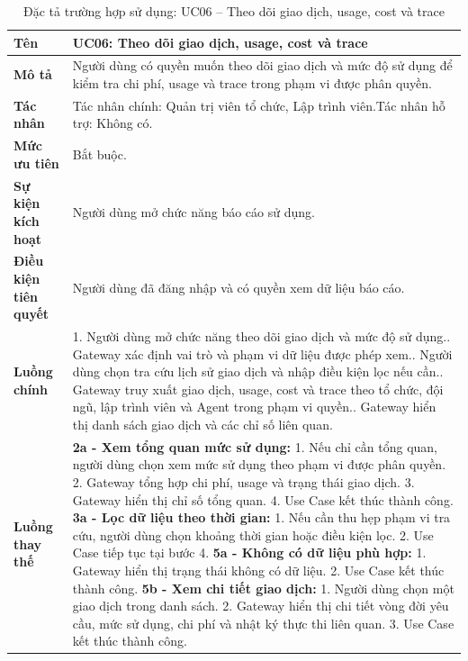 \begin{longtable}{|L{4.2cm}|L{9.5cm}|}
\caption[Đặc tả UC06]{Đặc tả trường hợp sử dụng: UC06 -- Theo dõi giao dịch, usage, cost và trace} \\\hline
\textbf{Tên} & UC06: Theo dõi giao dịch, usage, cost và trace \\\hline
\textbf{Mô tả} & Người dùng có quyền muốn theo dõi giao dịch và mức độ sử dụng để kiểm tra chi phí, usage và trace trong phạm vi được phân quyền.\\\hline
\textbf{Tác nhân} & Tác nhân chính: Quản trị viên tổ chức, Lập trình viên.\newline Tác nhân hỗ trợ: Không có.\\\hline
\textbf{Mức ưu tiên} & Bắt buộc.\\\hline
\textbf{Sự kiện kích hoạt} & Người dùng mở chức năng báo cáo sử dụng.\\\hline
\textbf{Điều kiện tiên quyết} & Người dùng đã đăng nhập và có quyền xem dữ liệu báo cáo.\\\hline
\textbf{Luồng chính} &
1. Người dùng mở chức năng theo dõi giao dịch và mức độ sử dụng.. Gateway xác định vai trò và phạm vi dữ liệu được phép xem.. Người dùng chọn tra cứu lịch sử giao dịch và nhập điều kiện lọc nếu cần.. Gateway truy xuất giao dịch, usage, cost và trace theo tổ chức, đội ngũ, lập trình viên và Agent trong phạm vi quyền.. Gateway hiển thị danh sách giao dịch và các chỉ số liên quan.\\\hline
\textbf{Luồng thay thế} &
\textbf{2a - Xem tổng quan mức sử dụng:} 1. Nếu chỉ cần tổng quan, người dùng chọn xem mức sử dụng theo phạm vi được phân quyền. 2. Gateway tổng hợp chi phí, usage và trạng thái giao dịch. 3. Gateway hiển thị chỉ số tổng quan. 4. Use Case kết thúc thành công.\newline
\textbf{3a - Lọc dữ liệu theo thời gian:} 1. Nếu cần thu hẹp phạm vi tra cứu, người dùng chọn khoảng thời gian hoặc điều kiện lọc. 2. Use Case tiếp tục tại bước 4.\newline
\textbf{5a - Không có dữ liệu phù hợp:} 1. Gateway hiển thị trạng thái không có dữ liệu. 2. Use Case kết thúc thành công.\newline
\textbf{5b - Xem chi tiết giao dịch:} 1. Người dùng chọn một giao dịch trong danh sách. 2. Gateway hiển thị chi tiết vòng đời yêu cầu, mức sử dụng, chi phí và nhật ký thực thi liên quan. 3. Use Case kết thúc thành công.\newline

\end{longtable}
